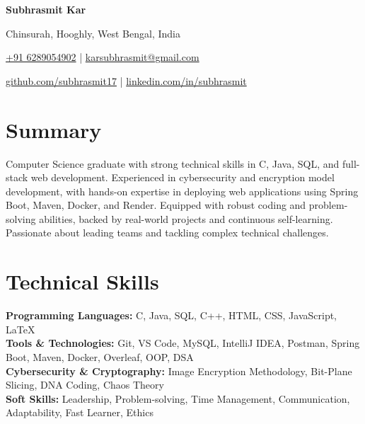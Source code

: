 \documentclass[a4paper,10pt]{article}
\begin{document}
\begin{center}
    {\fontsize{22}{24}\selectfont\textbf{Subhrasmit Kar}} \par
    
    \vspace{-0.3em}
    
    Chinsurah, Hooghly, West Bengal, India \par
    
    \vspace{-0.3em}
    
    \href{tel:+916289054902}{+91 6289054902} \quad | \quad \href{mailto:karsubhrasmit@gmail.com}{karsubhrasmit@gmail.com} \par
    
    \vspace{-0.5em}
    
    \href{https://github.com/subhrasmit17}{github.com/subhrasmit17} \quad | \quad \href{https://linkedin.com/in/subhrasmit}{linkedin.com/in/subhrasmit}
\end{center}



\vspace{-0.3em} %



\section*{Summary}
Computer Science graduate with strong technical skills in C, Java, SQL, and full-stack web development. Experienced in cybersecurity and encryption model development, with hands-on expertise in deploying web applications using Spring Boot, Maven, Docker, and Render. Equipped with robust coding and problem-solving abilities, backed by real-world projects and continuous self-learning. Passionate about leading teams and tackling complex technical challenges.






\section*{Technical Skills}
\textbf{Programming Languages:} C, Java, SQL, C++, HTML, CSS, JavaScript, LaTeX \\[0.5em]
\textbf{Tools \& Technologies:} Git, VS Code, MySQL, IntelliJ IDEA, Postman, Spring Boot, Maven, Docker, Overleaf, OOP, DSA \\[0.5em]
\textbf{Cybersecurity \& Cryptography:} Image Encryption Methodology, Bit-Plane Slicing, DNA Coding, Chaos Theory \\[0.5em]
\textbf{Soft Skills:} Leadership, Problem-solving, Time Management, Communication, Adaptability, Fast Learner, Ethics
\end{document}
